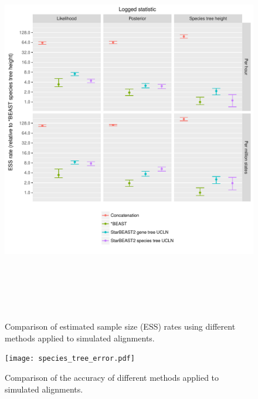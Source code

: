 \documentclass[12pt]{article}
\begin{document}
\clearpage

\begin{figure}[htb!]
\centering
\includegraphics[height=17cm]{multiple.pdf}
\caption
{Comparison of estimated sample size (ESS) rates using different methods applied to simulated alignments.}
\label{fig:loggedStatistics}
\end{figure}

\clearpage

\begin{figure}[htb!]
\centering
\texttt{[image: species\_tree\_error.pdf]}
\caption
{Comparison of the accuracy of different methods applied to simulated alignments.}
\label{fig:speciesTreeError}
\end{figure}

\clearpage
\end{document}
